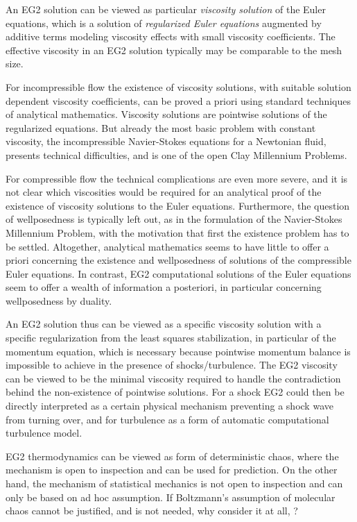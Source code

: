 An EG2 solution can be viewed as particular \emph{viscosity solution}
of the Euler equations, which is a solution of \emph{regularized 
Euler equations} augmented by additive terms modeling viscosity
effects with small viscosity coefficients. The effective viscosity in an 
EG2 solution typically may be comparable to the mesh size.

For incompressible flow the existence of viscosity solutions,
with suitable solution dependent viscosity coefficients, can
be proved a priori using standard techniques of analytical mathematics.
Viscosity solutions are pointwise solutions of the regularized 
equations. 
But already the most basic problem with constant viscosity,
the incompressible Navier-Stokes equations for a Newtonian fluid, presents
technical difficulties, and is one of the open Clay Millennium Problems.

For compressible flow the technical complications are even more
severe, and it is not clear which viscosities would be required 
for an analytical proof of the existence of viscosity 
solutions \cite{feireisl} to the Euler equations.
Furthermore, the question of wellposedness is typically left out, 
as in the formulation of the Navier-Stokes Millennium Problem, 
with the motivation that first the existence problem has to be settled. 
Altogether, analytical mathematics seems to have little to offer a 
priori concerning
the existence and wellposedness of solutions of the compressible Euler 
equations.
In contrast, EG2 computational solutions of the Euler equations
seem to offer a wealth of information a posteriori, in particular
concerning wellposedness by duality.

An EG2 solution thus can be viewed as a specific viscosity solution with 
a specific regularization from the least squares stabilization, in particular 
of the momentum equation, which is necessary because pointwise momentum balance
is impossible to achieve in the presence of shocks/turbulence. 
The EG2 viscosity can be viewed
to be the minimal viscosity required to handle the contradiction
behind the non-existence of pointwise solutions.  
For a shock EG2 could then be directly interpreted as  
a certain physical mechanism preventing a shock wave from turning over,
and for turbulence as a form of automatic computational turbulence
model.  

EG2 thermodynamics can be viewed as form of deterministic
chaos, where the mechanism is open to inspection and can be 
used for prediction. On the other hand, the mechanism
of statistical mechanics is not open to inspection and 
can only be based on ad hoc assumption. If Boltzmann's
assumption of molecular chaos cannot be justified, and 
is not needed, why consider it at all, \cite{loschmidt}?

